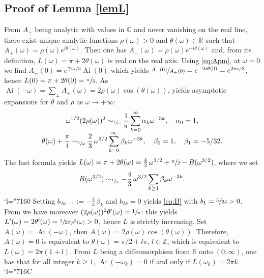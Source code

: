 \documentclass[JEP,XML,SOM,Unicode,NoEqCountersInSection,NoFloatCountersInSection,published]{cedram}
\DeclareMathOperator{\Ai}{Ai}
\newcommand{\Changel}{\mathcode`l="7160}
\newcommand{\Changelback}{\mathcode`l="716C}
\theoremstyle{plain}
\theoremstyle{definition}
\begin{document}
\subsection{Proof of Lemma \ref{lemL}}
From $A_+$ being analytic with values in $\mathbb{C}$ and never vanishing on the real line, there exist unique analytic functions $\rho(\omega)>0$ and $\theta(\omega)\!\in\!\mathbb{R}$
such that $A_+(\omega)=\rho(\omega)e^{i\theta(\omega)}$. Then one has $A_-(\omega)=\rho(\omega)e^{-i\theta(\omega)}$ and, from its definition, $L(\omega)=\pi+2\theta(\omega)$ is real on the real axis.
Using \eqref{eq:Apm}, at $\omega=0$ we find $A_{\pm}(0)=e^{\mp i\pi/3}\Ai(0)$ which yields $\sfrac{A_-(0)}{A_+(0)}=e^{-2i\theta(0)}=e^{2\pi i/3}$, hence $L(0)=\pi+2\theta(0)=\sfrac{\pi}{3}$. As $\Ai(-\omega)=\sum_{\pm}A_{\pm}(\omega)=2\rho(\omega) \cos(\theta(\omega))$, \cite[(2.87), (2.104), (2.106)]{AFbook} yields asymptotic expansions for $\theta$ and $\rho$ as $\omega\to +\infty$:\vspace*{-3pt}\enlargethispage{\baselineskip}%
\begin{gather*}
\omega^{1/2}(2\rho(\omega))^2\sim_{\sfrac 1\omega} \frac{1}{\pi}\sum_{k=0}^{\infty}\alpha_k \omega^{-3k}, \quad \alpha_0=1,\\[
-5pt]
\theta(\omega)+\frac{\pi}{4}\sim_{\sfrac 1\omega} \frac 23\, \omega^{3/2}\sum_{k=0}^{\infty}\beta_k\omega^{-3k},\quad \beta_0=1,\quad \beta_1=-5/32.
\end{gather*}
The last formula yields $L(\omega)=\pi+2\theta(\omega)=\frac 43\, \omega^{3/2}+\sfrac{\pi}{2}-B(\omega^{3/2})$, where we set\vspace*{-5pt}
\[
B(\omega^{3/2})\sim_{\sfrac 1\omega}-\frac 43\,\omega^{3/2}\sum_{k\geq 1}\beta_k \omega^{-3k}.
\]
\Changel
Setting $b_{2k-1}:=-\frac 43\,\beta_k$ and $b_{2k}=0$ yields \eqref{eq:B} with $b_1=\sfrac{5}{24}>0$. From \cite[(2.95)]{AFbook} we have moreover $(2\rho(\omega))^2\theta'(\omega)=\sfrac{1}{\pi}$: this yields $L'(\omega)=2\theta'(\omega)=\sfrac{1}{2\pi\rho^2(\omega)}>0$,
hence $L$ is strictly increasing. Set $A(\omega)=\Ai(-\omega)$, then $A(\omega)=2\rho(\omega)\cos(\theta(\omega))$. Therefore, $A(\omega)=0$ is equivalent to $\theta(\omega)=\pi/2+l\pi$, $l\in \mathbb{Z}$, which is equivalent to $L(\omega)=2\pi(1+l)$. From $L$ being a diffeomorphism from $\mathbb{R}$ onto $(0,\infty)$, one has that for all integer $k\geq 1$, $\Ai(-\omega_k)=0$ if and only if $L(\omega_k)=2\pi k$.
\Changelback
\end{document}
